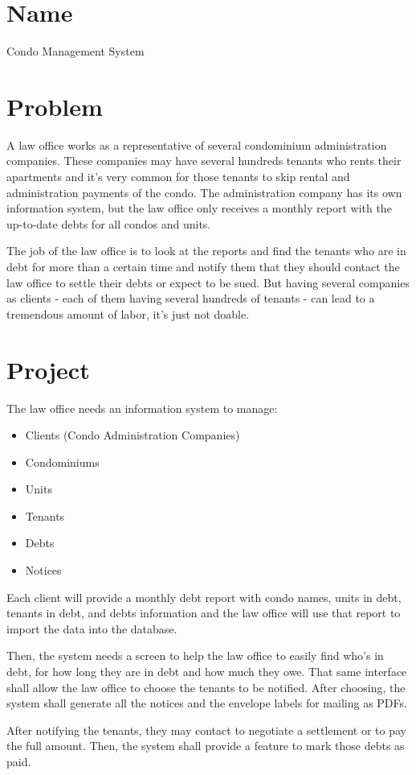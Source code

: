 \documentclass[10pt]{report}
\begin{document}
\maketitle

\section*{Name}
Condo Management System

\section*{Problem}

A law office works as a representative of several condominium administration companies. These companies may have several hundreds tenants who rents their apartments and it's very common for those tenants to skip rental and administration payments of the condo. The administration company has its own information system, but the law office only receives a monthly report with the up-to-date debts for all condos and units.

The job of the law office is to look at the reports and find the tenants who are in debt for more than a certain time and notify them that they should contact the law office to settle their debts or expect to be sued. But having several companies as clients - each of them having several hundreds of tenants - can lead to a tremendous amount of labor, it's just not doable.

\section*{Project}

The law office needs an information system to manage:

\begin{itemize}
  \item Clients (Condo Administration Companies)
  \item Condominiums
  \item Units
  \item Tenants
  \item Debts
  \item Notices
\end{itemize}

Each client will provide a monthly debt report with condo names, units in debt, tenants in debt, and debts information and the law office will use that report to import the data into the database.

Then, the system needs a screen to help the law office to easily find who's in debt, for how long they are in debt and how much they owe. That same interface shall allow the law office to choose the tenants to be notified. After choosing, the system shall generate all the notices and the envelope labels for mailing as PDFs.

After notifying the tenants, they may contact to negotiate a settlement or to pay the full amount. Then, the system shall provide a feature to mark those debts as paid.
\end{document}
